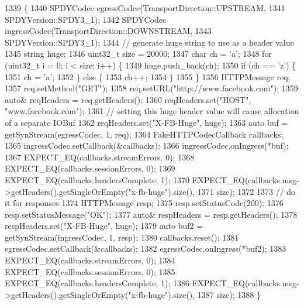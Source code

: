\begin{DoxyCode}
1339                                           \{
1340   SPDYCodec egressCodec(TransportDirection::UPSTREAM,
1341                         SPDYVersion::SPDY3\_1);
1342   SPDYCodec ingressCodec(TransportDirection::DOWNSTREAM,
1343                          SPDYVersion::SPDY3\_1);
1344   \textcolor{comment}{// generate huge string to use as a header value}
1345   \textcolor{keywordtype}{string} huge;
1346   uint32\_t size = 20000;
1347   \textcolor{keywordtype}{char} ch = \textcolor{charliteral}{'a'};
1348   \textcolor{keywordflow}{for} (uint32\_t i = 0; i < size; i++) \{
1349     huge.push\_back(ch);
1350     \textcolor{keywordflow}{if} (ch == \textcolor{charliteral}{'z'}) \{
1351       ch = \textcolor{charliteral}{'a'};
1352     \} \textcolor{keywordflow}{else} \{
1353       ch++;
1354     \}
1355   \}
1356   HTTPMessage req;
1357   req.setMethod(\textcolor{stringliteral}{"GET"});
1358   req.setURL(\textcolor{stringliteral}{"http://www.facebook.com"});
1359   \textcolor{keyword}{auto}& reqHeaders = req.getHeaders();
1360   reqHeaders.set(\textcolor{stringliteral}{"HOST"}, \textcolor{stringliteral}{"www.facebook.com"});
1361   \textcolor{comment}{// setting this huge header value will cause allocation of a separate IOBuf}
1362   reqHeaders.set(\textcolor{stringliteral}{"X-FB-Huge"}, huge);
1363   \textcolor{keyword}{auto} buf = getSynStream(egressCodec, 1, req);
1364   FakeHTTPCodecCallback callbacks;
1365   ingressCodec.setCallback(&callbacks);
1366   ingressCodec.onIngress(*buf);
1367   EXPECT\_EQ(callbacks.streamErrors, 0);
1368   EXPECT\_EQ(callbacks.sessionErrors, 0);
1369   EXPECT\_EQ(callbacks.headersComplete, 1);
1370   EXPECT\_EQ(callbacks.msg->getHeaders().getSingleOrEmpty(\textcolor{stringliteral}{"x-fb-huge"}).size(),
1371             size);
1372 
1373   \textcolor{comment}{// do it for responses}
1374   HTTPMessage resp;
1375   resp.setStatusCode(200);
1376   resp.setStatusMessage(\textcolor{stringliteral}{"OK"});
1377   \textcolor{keyword}{auto}& respHeaders = resp.getHeaders();
1378   respHeaders.set(\textcolor{stringliteral}{"X-FB-Huge"}, huge);
1379   \textcolor{keyword}{auto} buf2 = getSynStream(ingressCodec, 1, resp);
1380   callbacks.reset();
1381   egressCodec.setCallback(&callbacks);
1382   egressCodec.onIngress(*buf2);
1383   EXPECT\_EQ(callbacks.streamErrors, 0);
1384   EXPECT\_EQ(callbacks.sessionErrors, 0);
1385   EXPECT\_EQ(callbacks.headersComplete, 1);
1386   EXPECT\_EQ(callbacks.msg->getHeaders().getSingleOrEmpty(\textcolor{stringliteral}{"x-fb-huge"}).size(),
1387             size);
1388 \}
\end{DoxyCode}
